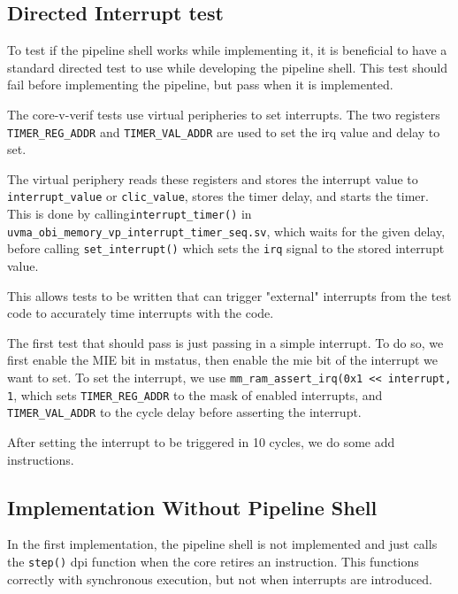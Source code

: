 
\subsection{Directed Interrupt test}

To test if the pipeline shell works while implementing it, it is beneficial to have a standard directed test to use while developing the pipeline shell.
This test should fail before implementing the pipeline, but pass when it is implemented.

The core-v-verif tests use virtual peripheries to set interrupts. 
The two registers \lstinline{TIMER_REG_ADDR} and \lstinline{TIMER_VAL_ADDR} are used to set the irq value and delay to set.  

The virtual periphery reads these registers and stores the interrupt value to \lstinline{interrupt_value} or \lstinline{clic_value}, stores the timer delay, and starts the timer. This is done by calling\lstinline{interrupt_timer()} in \lstinline{uvma_obi_memory_vp_interrupt_timer_seq.sv}, which waits for the given delay, before calling \lstinline{set_interrupt()} which sets the \lstinline{irq} signal to the stored interrupt value. 

This allows tests to be written that can trigger "external" interrupts from the test code to accurately time interrupts with the code.

The first test that should pass is just passing in a simple interrupt. To do so, we first enable the MIE bit in mstatus, then enable the mie bit of the interrupt we want to set. To set the interrupt, we use \lstinline{mm_ram_assert_irq(0x1 << interrupt, 1}, which sets \lstinline{TIMER_REG_ADDR} to the mask of enabled interrupts, and \lstinline{TIMER_VAL_ADDR} to the cycle delay before asserting the interrupt.

After setting the interrupt to be triggered in 10 cycles, we do some add instructions.




\subsection{Implementation Without Pipeline Shell}

In the first implementation, the pipeline shell is not implemented and just calls the \lstinline{step()} dpi function when the core retires an instruction. This functions correctly with synchronous execution, but not when interrupts are introduced. 

